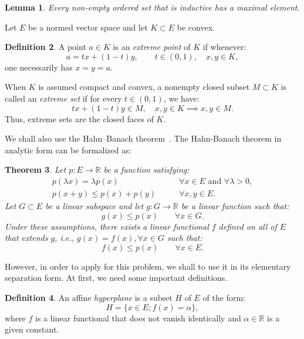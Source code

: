 \documentclass[reqno]{amsart}
\newtheorem{theorem}{Theorem}[section]
\newtheorem{lemma}[theorem]{Lemma}
\theoremstyle{definition}
\newtheorem{definition}[theorem]{Definition}
\newcommand{\R}{\mathbb{R}}
\begin{document}
\begin{lemma}\label{lemma:zorn}
    Every non-empty ordered set that is inductive has a maximal element.
\end{lemma}

Let $E$ be a normed vector space and let $K \subset E$ be convex.

\begin{definition}
A point $a \in K$ is an \emph{extreme point} of $K$ if whenever:
\begin{equation}
    a = tx + (1-t)y, \qquad t \in (0,1), \quad x,y \in K,
\end{equation}
one necessarily has $x = y = a$.
\end{definition}

When $K$ is assumed compact and convex, a nonempty closed subset $M \subset K$ is called an
\emph{extreme set} if for every $t \in (0,1)$, we have:
\begin{equation}
    tx + (1-t)y \in M, \quad x,y \in K \implies x,y \in M.
\end{equation}
Thus, extreme sets are the closed faces of $K$.

We shall also use the Hahn--Banach theorem~\citep{brezis2011,rudin1991}. The Hahn-Banach theorem in analytic form can be formalized as:
\begin{theorem}
    Let $p: E \rightarrow \R$ be a function satisfying:
    \begin{align}
        p(\lambda x) = \lambda p(x)&\qquad \forall x \in E \text{ and } \forall \lambda > 0,\\
        p(x + y) \leq p(x) + p(y) &\qquad \forall x, y \in E.
    \end{align}
    Let $G \subset E$ be a linear subspace and let $g: G \rightarrow \R$ be a linear function such that:
    \begin{equation}
        g(x) \leq p(x)\qquad\forall x \in G.
    \end{equation}
    Under these assumptions, there exists a linear functional $f$ defined on all of $E$ that extends $g$, i.e., $g(x) = f(x), \forall x \in G$ such that:
    \begin{equation}
        f(x) \leq p(x)\qquad\forall x \in E.
    \end{equation}
\end{theorem}

However, in order to apply for this problem, we shall to use it  in its elementary separation form. At first, we need some important definitions.
\begin{definition}
    An affine \textit{hyperplane} is a subset $H$ of $E$ of the form:
    \begin{equation}
        H = \{x \in E; f(x) = \alpha\},
    \end{equation}
    where $f$ is a linear functional that does not vanish identically and $\alpha \in \R$ is a given constant.
\end{definition}
\end{document}
